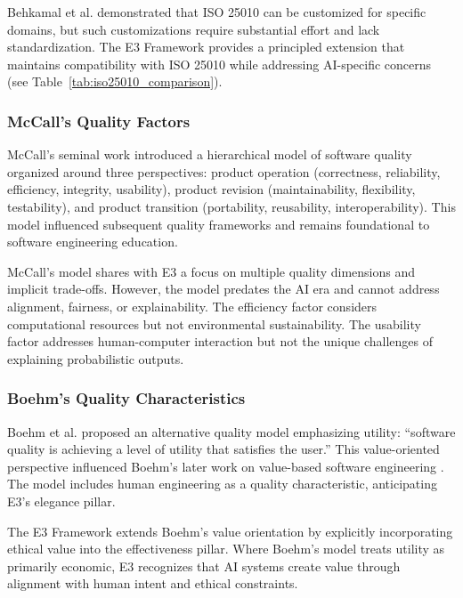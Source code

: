 Behkamal et al. \cite{behkamal2014customizing} demonstrated that ISO 25010 can be customized for specific domains, but such customizations require substantial effort and lack standardization. The E3 Framework provides a principled extension that maintains compatibility with ISO 25010 while addressing AI-specific concerns (see Table~\ref{tab:iso25010_comparison}).

\subsubsection{McCall's Quality Factors}

McCall's seminal work \cite{mccall1977factors} introduced a hierarchical model of software quality organized around three perspectives: product operation (correctness, reliability, efficiency, integrity, usability), product revision (maintainability, flexibility, testability), and product transition (portability, reusability, interoperability). This model influenced subsequent quality frameworks and remains foundational to software engineering education.

McCall's model shares with E3 a focus on multiple quality dimensions and implicit trade-offs. However, the model predates the AI era and cannot address alignment, fairness, or explainability. The efficiency factor considers computational resources but not environmental sustainability. The usability factor addresses human-computer interaction but not the unique challenges of explaining probabilistic outputs.

\subsubsection{Boehm's Quality Characteristics}

Boehm et al. \cite{boehm1978characteristics} proposed an alternative quality model emphasizing utility: ``software quality is achieving a level of utility that satisfies the user.'' This value-oriented perspective influenced Boehm's later work on value-based software engineering \cite{boehm2006value}. The model includes human engineering as a quality characteristic, anticipating E3's elegance pillar.

The E3 Framework extends Boehm's value orientation by explicitly incorporating ethical value into the effectiveness pillar. Where Boehm's model treats utility as primarily economic, E3 recognizes that AI systems create value through alignment with human intent and ethical constraints.


